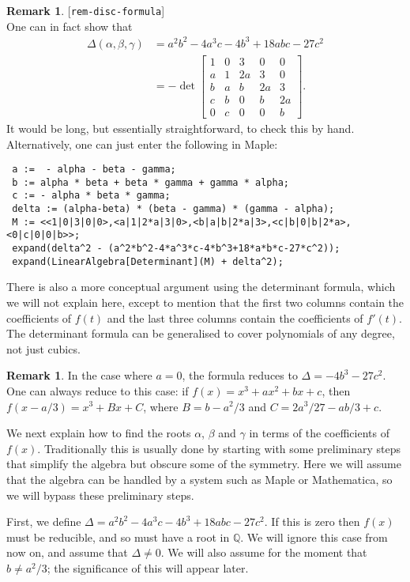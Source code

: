 \documentclass{amsart}
\newcommand{\lbl}[1]{\label{#1}\textup{[\texttt{#1}]}\ \\}
\newcommand{\lbl}{\label}
\newcommand{\Q}         {{\mathbb{Q}}}
\newcommand{\al}        {\alpha}
\newcommand{\bt}        {\beta}
\newcommand{\gm}        {\gamma}
\newcommand{\Dl}        {\Delta}
\newcommand{\bbm}       {\left[\begin{matrix}}
\newcommand{\ebm}       {\end{matrix}\right]}
\renewcommand{\:}{\colon}
\theoremstyle{definition}
\newtheorem{remark}[theorem]{Remark}
\begin{document}
\begin{remark}\lbl{rem-disc-formula}
 One can in fact show that 
 \begin{align*}
  \Delta(\al,\bt,\gm) &= a^2b^2-4a^3c-4b^3+18abc-27c^2 \\
  &= - \det\bbm 1&0&3&0&0 \\
                a&1&2a&3&0 \\
                b&a&b&2a&3 \\
                c&b&0&b&2a \\
                0&c&0&0&b \ebm.
 \end{align*}
 It would be long, but essentially straightforward, to check this by
 hand.  Alternatively, one can just enter the following in Maple:
 \begin{verbatim}
 a :=  - alpha - beta - gamma;
 b := alpha * beta + beta * gamma + gamma * alpha;
 c := - alpha * beta * gamma;
 delta := (alpha-beta) * (beta - gamma) * (gamma - alpha);
 M := <<1|0|3|0|0>,<a|1|2*a|3|0>,<b|a|b|2*a|3>,<c|b|0|b|2*a>,<0|c|0|0|b>>;
 expand(delta^2 - (a^2*b^2-4*a^3*c-4*b^3+18*a*b*c-27*c^2));
 expand(LinearAlgebra[Determinant](M) + delta^2);
 \end{verbatim}
 There is also a more conceptual argument using the determinant
 formula, which we will not explain here, except to mention that the
 first two columns contain the coefficients of $f(t)$ and the last three
 columns contain the coefficients of $f'(t)$.  The determinant formula
 can be generalised to cover polynomials of any degree, not just
 cubics. 
\end{remark}
\begin{remark}\label{rem-disc-simple}
 In the case where $a=0$, the formula reduces to $\Dl=-4b^3-27c^2$.
 One can always reduce to this case: if $f(x)=x^3+ax^2+bx+c$, then
 $f(x-a/3)=x^3+Bx+C$, where $B=b-a^2/3$ and $C=2a^3/27-ab/3+c$.  
\end{remark}

We next explain how to find the roots $\al$, $\bt$ and $\gm$ in terms
of the coefficients of $f(x)$.  Traditionally this is usually done by
starting with some preliminary steps that simplify the algebra but
obscure some of the symmetry.  Here we will assume that the algebra
can be handled by a system such as Maple or Mathematica, so we will
bypass these preliminary steps.

First, we define $\Dl=a^2b^2-4a^3c-4b^3+18abc-27c^2$.  If this is zero
then $f(x)$ must be reducible, and so must have a root in $\Q$.  We
will ignore this case from now on, and assume that $\Dl\neq 0$.  We
will also assume for the moment that $b\neq a^2/3$; the significance of
this will appear later.
\end{document}
